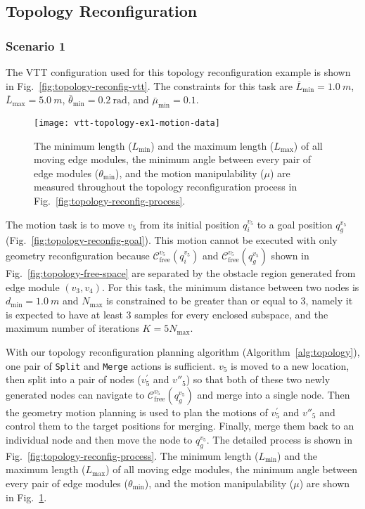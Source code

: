 \documentclass[journal]{IEEEtran}
\begin{document}
\subsection{Topology Reconfiguration}

\subsubsection{Scenario 1}

The VTT configuration used for this topology reconfiguration example
is shown in Fig.~\ref{fig:topology-reconfig-vtt}. The constraints for
this task are $\overline{L}_{\min}=\SI{1.0}{m}$,
$\overline{L}_{\max}=\SI{5.0}{m}$,
$\bar{\theta}_{\min}=\SI{0.2}{\radian}$, and $\bar{\mu}_{\min}=0.1$.

\begin{figure}[t!]
  \centering
  \texttt{[image: vtt-topology-ex1-motion-data]}
  \caption{The minimum length ($L_{\min}$) and the maximum length
    ($L_{\max}$) of all moving edge modules, the minimum angle between
    every pair of edge modules ($\theta_{\min}$), and the motion
    manipulability ($\mu$) are measured throughout the topology
    reconfiguration process in
    Fig.~\ref{fig:topology-reconfig-process}.}
  \label{fig:topology-test1-data}
\end{figure}

The motion task is to move $v_5$ from its initial position $q_i^{v_5}$
to a goal position $q_g^{v_5}$
(Fig.~\ref{fig:topology-reconfig-goal}). This motion cannot be
executed with only geometry reconfiguration because
$\mathcal{C}_{\mathrm{free}}^{v_5}(q_i^{v_5})$ and
$\mathcal{C}_{\mathrm{free}}^{v_5}(q_g^{v_5})$ shown in
Fig.~\ref{fig:topology-free-space} are separated by the obstacle
region generated from edge module $(v_3, v_4)$. For this task, the
minimum distance between two nodes is $d_{\min} = \SI{1.0}{m}$ and
$N_{\max}$ is constrained to be greater than or equal to $3$, namely
it is expected to have at least 3 samples for every enclosed subspace,
and the maximum number of iterations $K = 5N_{\max}$.

With our topology reconfiguration planning algorithm
(Algorithm~\ref{alg:topology}), one pair of \texttt{Split} and
\texttt{Merge} actions is sufficient. $v_5$ is moved to a new
location, then split into a pair of nodes ($v^\prime_5$ and $v''_5$)
so that both of these two newly generated nodes can navigate to
$\mathcal{C}_{\mathrm{free}}^{v_5}(q_g^{v_5})$ and merge into a single
node. Then the geometry motion planning is used to plan the motions of
$v^\prime_5$ and $v''_5$ and control them to the target positions for
merging. Finally, merge them back to an individual node and then move
the node to $q_g^{v_5}$. The detailed process is shown in
Fig.~\ref{fig:topology-reconfig-process}. The minimum length
($L_{\min}$) and the maximum length ($L_{\max}$) of all moving edge
modules, the minimum angle between every pair of edge modules
($\theta_{\min}$), and the motion manipulability ($\mu$) are shown in
Fig.~\ref{fig:topology-test1-data}.
\end{document}
